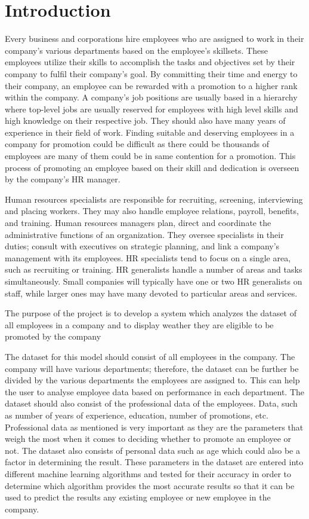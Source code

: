 \documentclass[11pt,conference]{IEEEtran}
\begin{document}
\section{Introduction}
Every business and corporations hire employees who are assigned to work in their company’s various departments based on the employee’s skillsets. These employees utilize their skills to accomplish the tasks and objectives set by their company to fulfil their company’s goal. By committing their time and energy to their company, an employee can be rewarded with a promotion to a higher rank within the company. A company’s job positions are usually based in a hierarchy where top-level jobs are usually reserved for employees with high level skills and high knowledge on their respective job. They should also have many years of experience in their field of work. Finding suitable and deserving employees in a company for promotion could be difficult as there could be thousands of employees are many of them could be in same contention for a promotion. This process of promoting an employee based on their skill and dedication is overseen by the company’s HR manager.  \par
Human resources specialists are responsible for recruiting, screening, interviewing and placing workers. They may also handle employee relations, payroll, benefits, and training. Human resources managers plan, direct and coordinate the administrative functions of an organization. They oversee specialists in their duties; consult with executives on strategic planning, and link a company's management with its employees. HR specialists tend to focus on a single area, such as recruiting or training. HR generalists handle a number of areas and tasks simultaneously. Small companies will typically have one or two HR generalists on staff, while larger ones may have many devoted to particular areas and services.\par
The purpose of the project is to develop a system which analyzes the dataset of all employees in a company and to display weather they are eligible to be promoted by the company\par
The dataset for this model should consist of all employees in the company. The company will have various departments; therefore, the dataset can be further be divided by the various departments the employees are assigned to. This can help the user to analyse employee data based on performance in each department. The dataset should also consist of the professional data of the employees. Data, such as number of years of experience, education, number of promotions, etc. Professional data as mentioned is very important as they are the parameters that weigh the most when it comes to deciding whether to promote an employee or not. The dataset also consists of personal data such as age which could also be a factor in determining the result. These parameters in the dataset are entered into different machine learning algorithms and tested for their accuracy in order to determine which algorithm provides the most accurate results so that it can be used to predict the results any existing employee or new employee in the company.\par
\end{document}
